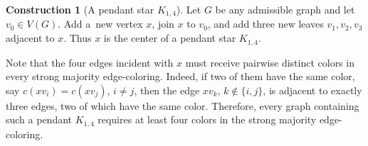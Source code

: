 \documentclass[11pt]{article}
\theoremstyle{definition}
\newtheorem{construction}{Construction}
\begin{document}
\begin{construction}[A pendant star \(K_{1,4}\)]
Let \(G\) be any admissible graph and let \(v_0\in V(G)\). Add a~new vertex \(x\), join \(x\) to \(v_0\), and add three new leaves \(v_1,v_2,v_3\) adjacent to \(x\). Thus \(x\) is the center of a pendant star \(K_{1,4}\).

Note that the four edges incident with \(x\) must receive pairwise distinct colors in every
strong majority edge-coloring. Indeed, if two of them have the same color, say $c(xv_i)=c(xv_j)$, $i\neq j$, then the edge \(xv_k\), $k\notin\{i,j\}$, is adjacent to exactly three edges, two of which have the same color. Therefore, every graph containing such a pendant \(K_{1,4}\) requires at least four colors in the strong majority edge-coloring.
\end{construction}
\end{document}
